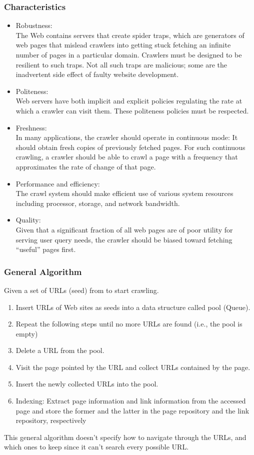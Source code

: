 \documentclass[12pt, a4paper]{report}
\begin{document}
\subsubsection{Characteristics}
\begin{itemize}
    \item Robustness:\\
    The Web contains servers that create spider traps, which are generators of web pages that mislead crawlers into getting stuck fetching an infinite number of  pages in a particular domain. Crawlers must be designed to be resilient to such traps. Not all such traps are malicious; some are the inadvertent side effect of faulty website development.
    \item Politeness:\\
    Web servers have both implicit and explicit policies regulating the rate at which a crawler can visit them. These politeness policies must be respected.
    \item Freshness:\\
    In many applications, the crawler should operate in continuous mode: It should obtain fresh copies of previously fetched pages. For such continuous crawling, a crawler should be able to crawl a page with a frequency that approximates the rate of change of that page.
    \item Performance and efficiency:\\
    The crawl system should make efficient use of various system resources including processor, storage, and network bandwidth.
    \item Quality: \\
    Given that a significant fraction of all web pages are of poor utility for serving user query needs, the crawler should be biased toward fetching “useful” pages first.
\end{itemize}

\subsubsection{General Algorithm}
Given a set of URLs (seed) from to start crawling.
\begin{enumerate}
    \item Insert URLs of Web sites as seeds into a data structure called pool (Queue).
    \item Repeat the following steps until no more URLs are found (i.e., the pool is empty)
    \item Delete a URL from the pool.
    \item Visit the page pointed by the URL and collect URLs contained by the page. 
    \item Insert the newly collected URLs into the pool.
    \item Indexing: Extract page information and link information from the accessed page and store the former and the latter in the page repository and the link repository, respectively
\end{enumerate}
This general algorithm doesn't specify how to navigate through the URLs, and which ones to keep since it can't search every possible URL.
\end{document}
